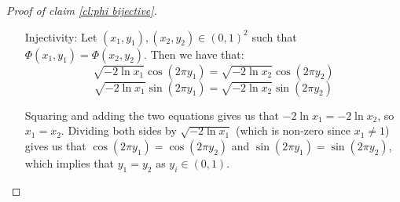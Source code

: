 \begin{proof}[Proof of claim \ref{cl:phi bijective}]
\begin{enumerate}[align=left]
              Since the ray $\{(u, 0): u \geq 0\}$ is excluded from the codomain of $\Phi$, we have that $\theta \in (0, 2\pi)$, so we can define $y = \theta / (2\pi) \in (0, 1)$. We also define $x = e^{-(z^2 + t^2)/2} \in (0, 1)$ (either $z$ or $t$ is non-zero) to obtain that:
              \begin{align*}
                  \Phi(x, y) =
                  \begin{pmatrix}
                      \sqrt{-2 \ln x} \cos (2\pi y) \\
                      \sqrt{-2 \ln x} \sin (2\pi y)
                  \end{pmatrix}
                   & =
                  \begin{pmatrix}
                      \sqrt{-2 (-(z^2 + t^2)/2)} \cos (2\pi \cdot \theta / (2\pi)) \\
                      \sqrt{-2 (-(z^2 + t^2)/2)} \sin (2\pi \cdot \theta / (2\pi))
                  \end{pmatrix}
                  \\ &= \sqrt{z^2 + t^2}
                  \begin{pmatrix}
                      \cos (\theta) \\
                      \sin (\theta)
                  \end{pmatrix}
                  \overset{\eqref{eq:atan theta}}{=}
                  \begin{pmatrix}
                      z \\
                      t
                  \end{pmatrix}
              \end{align*}
        \item[Injectivity:] Let $(x_1, y_1), (x_2, y_2) \in (0, 1)^2$ such that $\Phi(x_1, y_1) = \Phi(x_2, y_2)$. Then we have that:
              \[\sqrt{-2 \ln x_1} \cos(2\pi y_1) = \sqrt{-2 \ln x_2} \cos(2\pi y_2)\]
              \[\sqrt{-2 \ln x_1} \sin(2\pi y_1) = \sqrt{-2 \ln x_2} \sin(2\pi y_2)\]

              Squaring and adding the two equations gives us that $-2\ln x_1 = -2\ln x_2$, so $x_1 = x_2$. Dividing both sides by $\sqrt{-2 \ln x_1}$ (which is non-zero since $x_1 \neq 1$) gives us that $\cos(2\pi y_1) = \cos(2\pi y_2)$ and $\sin(2\pi y_1) = \sin(2\pi y_2)$, which implies that $y_1 = y_2$ as $y_i \in (0, 1)$.
    \end{enumerate}
\end{proof}

